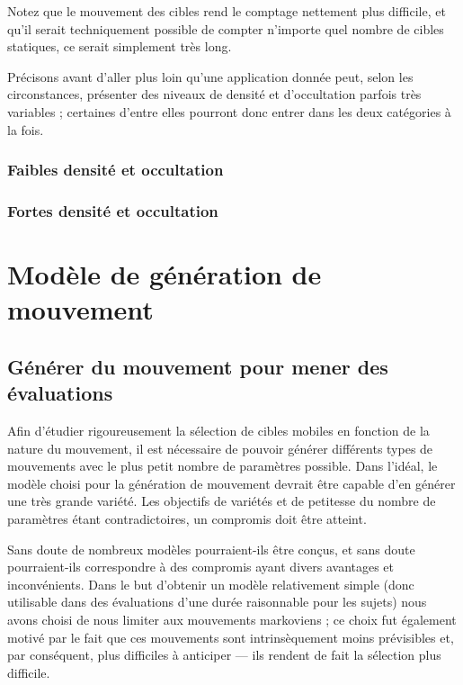 	Notez que le mouvement des cibles rend le comptage nettement plus difficile, et qu'il serait techniquement possible de compter n'importe quel nombre de cibles statiques, ce serait simplement très long.
	
	Précisons avant d'aller plus loin qu'une application donnée peut, selon les circonstances, présenter des niveaux de densité et d'occultation parfois très variables ; certaines d'entre elles pourront donc entrer dans les deux catégories à la fois.
	
	\subsubsection{Faibles densité et occultation}
	
	
	\subsubsection{Fortes densité et occultation}

\section{Modèle de génération de mouvement}
    \subsection{Générer du mouvement pour mener des évaluations}
    Afin d'étudier rigoureusement la sélection de cibles mobiles en fonction de la nature du mouvement, il est nécessaire de pouvoir générer différents types de mouvements avec le plus petit nombre de paramètres possible. Dans l'idéal, le modèle choisi pour la génération de mouvement devrait être capable d'en générer une très grande variété. Les objectifs de variétés et de petitesse du nombre de paramètres étant contradictoires, un compromis doit être atteint.
    
    Sans doute de nombreux modèles pourraient-ils être conçus, et sans doute pourraient-ils correspondre à des compromis ayant divers avantages et inconvénients. Dans le but d'obtenir un modèle relativement simple (donc utilisable dans des évaluations d'une durée raisonnable pour les sujets) nous avons choisi de nous limiter aux mouvements markoviens ; ce choix fut également motivé par le fait que ces mouvements sont intrinsèquement moins prévisibles et, par conséquent, plus difficiles à anticiper --- ils rendent de fait la sélection plus difficile.
    
